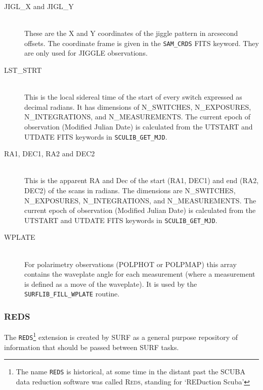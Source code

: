 \documentclass[twoside,11pt,nolof]{starlink}
\begin{document}
\begin{description}

\item[JIGL\_X and JIGL\_Y]\mbox{} \\

These are the X and Y coordinates of the jiggle pattern in arcsecond
offsets. The coordinate frame is given in the \texttt{SAM\_CRDS} FITS keyword.
They are only used for JIGGLE observations.

\item[LST\_STRT]\mbox{} \\

This is the local sidereal time of the start of every switch expressed as
decimal radians. It has dimensions of N\_SWITCHES, N\_EXPOSURES,
N\_INTEGRATIONS, and N\_MEASUREMENTS. The current epoch of observation
(Modified Julian Date) is calculated from the UTSTART and UTDATE FITS
keywords in \texttt{SCULIB\_GET\_MJD}.

\item[RA1, DEC1, RA2 and DEC2]\mbox{} \\

This is the apparent RA and Dec of the start (RA1, DEC1) and end (RA2, DEC2)
of the scans in radians. The dimensions are N\_SWITCHES, N\_EXPOSURES,
N\_INTEGRATIONS, and N\_MEASUREMENTS. The current epoch of observation
(Modified Julian Date) is calculated from the UTSTART and UTDATE FITS
keywords in \texttt{SCULIB\_GET\_MJD}.

\item[WPLATE]\mbox{} \\

For polarimetry observations (POLPHOT or POLPMAP) this array contains the
waveplate angle for each measurement (where a measurement is defined as a move
of the waveplate). It is used by the \texttt{SURFLIB\_FILL\_WPLATE} routine.

\end{description}

\subsubsection{REDS}

The \texttt{REDS}\footnote{The name \texttt{REDS} is historical, at some time
in the distant past the SCUBA data reduction software was called
\textsc{Reds}, standing for `REDuction Scuba'} extension is created by SURF
as a general purpose repository of information that should be passed between
SURF tasks.
\end{document}
